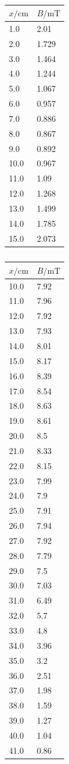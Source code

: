 \documentclass[11pt,ngerman,a4paper]{article}
\begin{document}
\begin{table}
\centering
\begin{tabular}{ll}
\toprule
{$x / \si{\centi\meter}$} &{ $B/\si{\milli\tesla}$ }\\
\midrule
1.0 & 2.01\\
2.0 & 1.729\\
3.0 & 1.464\\
4.0 & 1.244\\
5.0 & 1.067\\
6.0 & 0.957\\
7.0 & 0.886\\
8.0 & 0.867\\
9.0 & 0.892\\
10.0 & 0.967\\
11.0 & 1.09\\
12.0 & 1.268\\
13.0 & 1.499\\
14.0 & 1.785\\
15.0 & 2.073\\
\bottomrule
\end{tabular}
\label{}
\caption{}
\end{table}

\begin{table}
\centering
\begin{tabular}{ll}
\toprule
{$x / \si{\centi\meter}$} &{ $B/\si{\milli\tesla}$ }\\
\midrule
10.0 & 7.92\\
11.0 & 7.96\\
12.0 & 7.92\\
13.0 & 7.93\\
14.0 & 8.01\\
15.0 & 8.17\\
16.0 & 8.39\\
17.0 & 8.54\\
18.0 & 8.63\\
19.0 & 8.61\\
20.0 & 8.5\\
21.0 & 8.33\\
22.0 & 8.15\\
23.0 & 7.99\\
24.0 & 7.9\\
25.0 & 7.91\\
26.0 & 7.94\\
27.0 & 7.92\\
28.0 & 7.79\\
29.0 & 7.5\\
30.0 & 7.03\\
31.0 & 6.49\\
32.0 & 5.7\\
33.0 & 4.8\\
34.0 & 3.96\\
35.0 & 3.2\\
36.0 & 2.51\\
37.0 & 1.98\\
38.0 & 1.59\\
39.0 & 1.27\\
40.0 & 1.04\\
41.0 & 0.86\\
\bottomrule
\end{tabular}
\label{}
\caption{}
\end{table}
\end{document}
